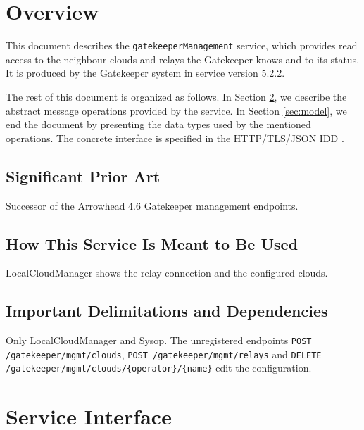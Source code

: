 \documentclass[a4paper]{arrowhead}
\begin{document}
\section{Overview}
\label{sec:overview}

This document describes the \texttt{gatekeeper\allowbreak{}Management} service, which provides read access to the neighbour clouds and relays the Gatekeeper knows and to its status.
It is produced by the Gatekeeper system \cite{gk-sysd} in service version 5.2.2.

The rest of this document is organized as follows.
In Section \ref{sec:operations}, we describe the abstract message operations provided by the service.
In Section \ref{sec:model}, we end the document by presenting the data types used by the mentioned operations.
The concrete interface is specified in the HTTP/TLS/JSON IDD \cite{gk-gatekeeperManagement-http-idd}.

\subsection{Significant Prior Art}

Successor of the Arrowhead 4.6 Gatekeeper management endpoints.

\subsection{How This Service Is Meant to Be Used}

LocalCloudManager shows the relay connection and the configured clouds.

\subsection{Important Delimitations and Dependencies}
\label{sec:delimitations}

Only LocalCloudManager and Sysop. The unregistered endpoints \texttt{POST /\allowbreak{}gatekeeper/\allowbreak{}mgmt/\allowbreak{}clouds}, \texttt{POST /\allowbreak{}gatekeeper/\allowbreak{}mgmt/\allowbreak{}relays} and \texttt{DELETE /\allowbreak{}gatekeeper/\allowbreak{}mgmt/\allowbreak{}clouds/\allowbreak{}\{operator\}/\allowbreak{}\{name\}} edit the configuration.

\newpage

\section{Service Interface}
\label{sec:operations}
\end{document}
